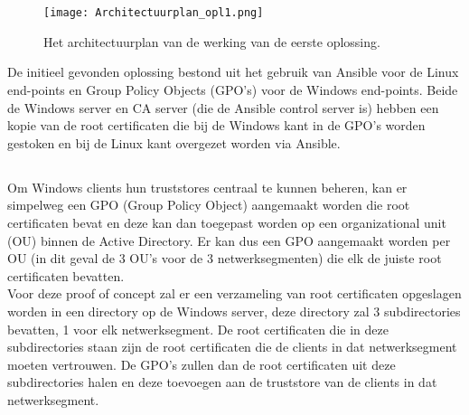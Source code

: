 \pagebreak

\section{}%
\label{sec:Eerste_oplossing}

\begin{figure}
  \centering
  \texttt{[image: Architectuurplan\_opl1.png]}
  \caption[Architectuurplan van de eerste oplossing]{\label{fig:opl1} Het architectuurplan van de werking van de eerste oplossing.}
\end{figure}

De initieel gevonden oplossing bestond uit het gebruik van Ansible voor de Linux end-points en Group Policy Objects (GPO's) voor de Windows end-points. Beide de Windows server en CA server (die de Ansible control server is) hebben een kopie van de root certificaten die bij de Windows kant in de GPO's worden gestoken en bij de Linux kant overgezet worden via Ansible.

\subsection{}
\label{subsec:Oplossing_door_middel_van_GPOs_met_root_certificaten}
Om Windows clients hun truststores centraal te kunnen beheren, kan er simpelweg een GPO (Group Policy Object) aangemaakt worden die root certificaten bevat en deze kan dan toegepast worden op een organizational unit (OU) binnen de Active Directory.
Er kan dus een GPO aangemaakt worden per OU (in dit geval de 3 OU's voor de 3 netwerksegmenten) die elk de juiste root certificaten bevatten. \\

Voor deze proof of concept zal er een verzameling van root certificaten opgeslagen worden in een directory op de Windows server, deze directory zal 3 subdirectories bevatten, 1 voor elk netwerksegment. De root certificaten die in deze subdirectories staan zijn de root certificaten die de clients in dat netwerksegment moeten vertrouwen.
De GPO's zullen dan de root certificaten uit deze subdirectories halen en deze toevoegen aan de truststore van de clients in dat netwerksegment. \\


